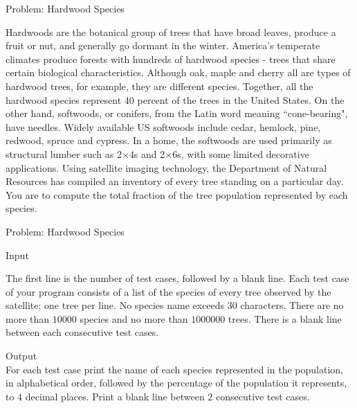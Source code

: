 \documentclass[12pt,t]{beamer}
\begin{document}
\begin{frame}{Problem: Hardwood Species}

\vspace{0pt}

{\footnotesize
Hardwoods are the botanical group of trees that have broad leaves, produce a fruit or nut, and generally go dormant in the winter.
America's temperate climates produce forests with hundreds of
hardwood species - trees that share certain biological characteristics.
Although oak, maple and cherry all are types of hardwood
trees, for example, they are different species. Together, all the hardwood species represent 40 percent of the trees in the United States.
On the other hand, softwoods, or conifers, from the Latin word
meaning ``cone-bearing", have needles.  Widely available US softwoods include cedar, hemlock, pine, redwood, spruce and cypress.  In a home, the softwoods are used primarily as structural
lumber such as 2$\times$4s and 2$\times$6s, with some limited decorative applications.
Using satellite imaging technology, the Department of Natural Resources has compiled an inventory of every tree standing on a particular day.
You are to compute the total fraction of the tree population represented by each species.
}
\end{frame}

\begin{frame}{Problem: Hardwood Species}

    \vspace{20pt}
    {\footnotesize\color{title} Input}\\
    {\small
The first line is the number of test cases, followed by a blank line.
Each test case of your program consists of a list of the species of every tree observed by the satellite;
one tree per line. No species name exceeds $30$ characters. There are no more than $10000$ species and
no more than $1000000$ trees.
There is a blank line between each consecutive test cases.

    }

    \vspace{20pt}
    {\footnotesize\color{title} Output}\\
    {\small
For each test case print the name of each species represented in the population, in alphabetical order,
followed by the percentage of the population it represents, to $4$ decimal places.
Print a blank line between $2$ consecutive test cases.
    }
\end{frame}
\end{document}
